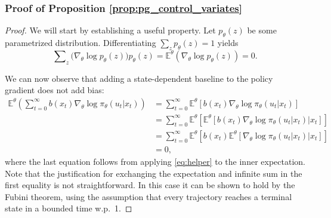 \subsubsection{Proof of Proposition \ref{prop:pg_control_variates}}
\begin{proof}
We will start by establishing a useful property. 
Let $p_\theta(z)$ be some parametrized distribution. Differentiating $\sum\nolimits_{z } {{p_\theta }(z)}  = 1$  yields
\begin{equation}\label{eq:helper}
\sum\nolimits_{z} {(\nabla_\theta \log {p_\theta }({z})} ){p_\theta }({z}) = {\mathbb E^\theta }(\nabla_\theta  \log {p_\theta }({z})) = 0.
\end{equation}

We can now observe that adding a state-dependent baseline to the policy gradient does not add bias:
\begin{equation*}
\begin{split}
{\mathbb E^\theta }\left( \sum_{t=0}^\infty b(x_t) {{\nabla _\theta }\log {\pi _\theta }({u_t}|{x_t})} \right) &= \sum_{t=0}^\infty {\mathbb E^\theta }\left[ b(x_t) {{\nabla _\theta }\log {\pi _\theta }({u_t}|{x_t})} \right] \\ 
&= \sum_{t=0}^\infty {\mathbb E^\theta }\left[ {\mathbb E^\theta }\left[ \left. b(x_t) {{\nabla _\theta }\log {\pi _\theta }({u_t}|{x_t})} \right| x_t \right]\right] \\ 
&= \sum_{t=0}^\infty {\mathbb E^\theta }\left[ b(x_t) {\mathbb E^\theta }\left[ \left. {{\nabla _\theta }\log {\pi _\theta }({u_t}|{x_t})} \right| x_t \right]\right] \\ 
&= 0,
\end{split}
\end{equation*}
where the last equation follows from applying \eqref{eq:helper} to the inner expectation. Note that the justification for exchanging the expectation and infinite sum in the first equality is not straightforward. In this case it can be shown to hold by the Fubini theorem, using the assumption that every trajectory reaches a terminal state in a bounded time w.p.~1.


\end{proof}
